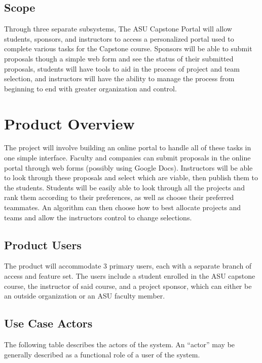\documentclass[12pt]{article}
\begin{document}
\subsection{Scope}

Through three separate subsystems, The ASU Capstone Portal will allow students, sponsors, and instructors to access a personalized portal used to complete various tasks for the Capstone course. Sponsors will be able to submit proposals though a simple web form and see the status of their submitted proposals, students will have tools to aid in the process of project and team selection, and instructors will have the ability to manage the process from beginning to end with greater organization and control.

\section{Product Overview}

The project will involve building an online portal to handle all of these tasks in one simple interface. Faculty and companies can submit proposals in the online portal through web forms (possibly using Google Docs). Instructors will be able to look through these proposals and select which are viable, then publish them to the students. Students will be easily able to look through all the projects and rank them according to their preferences, as well as choose their preferred teammates. An algorithm can then choose how to best allocate projects and teams and allow the instructors control to change selections.

\subsection{Product Users}

The product will accommodate 3 primary users, each with a separate branch of access and feature set. The users include a student enrolled in the ASU capstone course, the instructor of said course, and a project sponsor, which can either be an outside organization or an ASU faculty member.

\subsection{Use Case Actors}

The following table describes the actors of the system. An ``actor'' may be generally described as a functional role of a user of the system.
\end{document}
